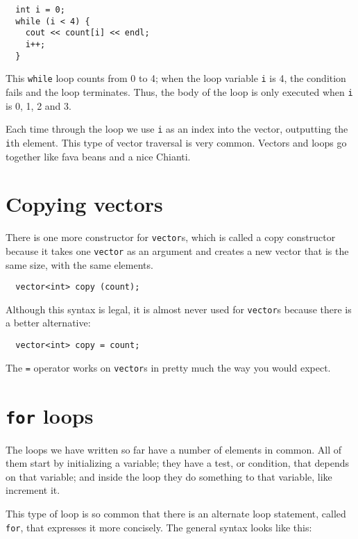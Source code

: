 \begin{lstlisting}
  int i = 0;
  while (i < 4) {
    cout << count[i] << endl;
    i++;
  }
\end{lstlisting}
%
This {\tt while} loop counts from 0
to 4; when the loop variable {\tt i} is 4, the
condition fails and the loop terminates.  Thus, the body
of the loop is only executed when {\tt i} is 0, 1, 2 and 3.


Each time through the loop we use {\tt i} as an index into
the vector, outputting the {\tt i}th element.  This type of
vector traversal is very common.  Vectors and loops go together
like fava beans and a nice Chianti.

\section{Copying vectors}

There is one more constructor for {\tt vector}s, which is
called a copy constructor because it takes one {\tt vector}
as an argument and creates a new vector that is the same size,
with the same elements.

\begin{lstlisting}
  vector<int> copy (count);
\end{lstlisting}
%
Although this syntax is legal, it is almost never used for
{\tt vector}s because there is a better alternative:

\begin{lstlisting}
  vector<int> copy = count;
\end{lstlisting}
%
The {\tt =} operator works on {\tt vector}s in pretty much
the way you would expect.

\section{{\tt for} loops}

The loops we have written so far have a number of elements
in common.  All of them start by initializing a variable;
they have a test, or condition, that depends on that variable;
and inside the loop they do something to that variable,
like increment it.


This type of loop is so common that there is an alternate
loop statement, called {\tt for}, that expresses it more
concisely.  The general syntax looks like this:

